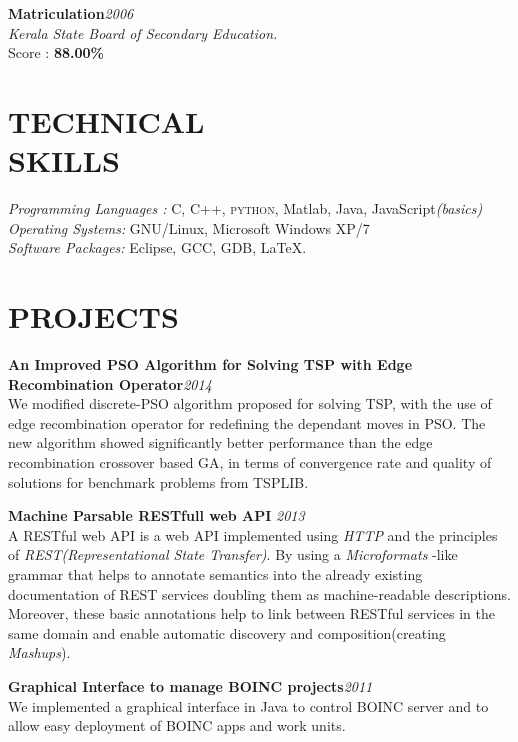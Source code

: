 \documentclass[line,margin]{res}
\begin{document}
\begin{resume}
        {\bf Matriculation}\hfill {\it 2006}\\
        {\it Kerala State Board of Secondary Education.}\\
        Score : {\bf 88.00\% } 
	\section{TECHNICAL \\ SKILLS} 
		{\it Programming Languages :} C, C++, \textsc{python}, Matlab, Java, JavaScript{\it (basics)}\\
		{\it Operating Systems:} GNU/Linux, Microsoft Windows XP/7\\
		{\it Software Packages:} Eclipse, GCC, GDB, \LaTeX.
	\section{PROJECTS}
		{\bf An Improved PSO Algorithm for Solving TSP with Edge Recombination Operator}\hfill {\it 2014}\\
		We modified discrete-PSO algorithm proposed for solving TSP, with the use of edge recombination operator for redefining the dependant moves in PSO. The new algorithm showed significantly better performance than the edge recombination crossover based GA, in terms of convergence rate and quality of solutions for benchmark problems from TSPLIB.

	    {\bf Machine Parsable RESTfull web API }\hfill {\it 2013}\\
	    A RESTful web API is a web API implemented using {\it HTTP }and the principles of {\it REST(Representational State Transfer)}. By using  a {\it Microformats }-like grammar that helps to annotate semantics into the already existing documentation of REST services doubling them as machine-readable descriptions. Moreover, these basic annotations help to link between RESTful services in the same domain and enable automatic discovery and composition(creating {\it Mashups}).

        {\bf Graphical Interface to manage BOINC projects}\hfill {\it 2011}\\
		We implemented a graphical interface in Java to control BOINC server and to allow easy deployment of BOINC apps and work units.	

\end{resume}
\end{document}
